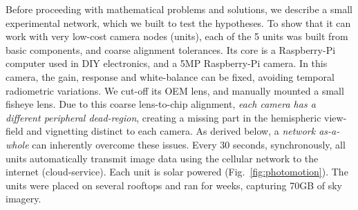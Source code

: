 \documentclass[runningheads]{llncs}
\begin{document}
Before proceeding with mathematical problems and solutions, we describe  a small experimental network, which we built to test the hypotheses. To show that it can work with very low-cost  camera nodes (units), each of the 5 units was built from basic components, and coarse alignment tolerances. Its core is a Raspberry-Pi computer used in DIY electronics, and a 5MP Raspberry-Pi camera. In this camera, the gain, response and white-balance can be fixed, avoiding temporal radiometric variations. We cut-off its OEM lens, and manually mounted a small fisheye lens. Due to this coarse lens-to-chip alignment, {\em each camera has a different peripheral dead-region}, creating a missing part in the hemispheric view-field and vignetting distinct to each camera. As derived below, a {\em {\em network} as-a-whole} can inherently overcome these issues. Every 30 seconds, synchronously, all units automatically transmit image data using the cellular network to the internet (cloud-service). Each unit is solar powered (Fig.~\ref{fig:photomotion}).
The units were placed on several rooftops and ran for weeks, capturing 70GB of sky imagery.
\end{document}
